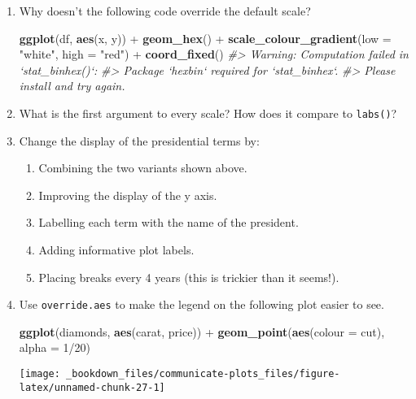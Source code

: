 \documentclass[]{book}
\newenvironment{Shaded}{\begin{snugshade}}{\end{snugshade}}
\newcommand{\KeywordTok}[1]{\textcolor[rgb]{0.13,0.29,0.53}{\textbf{{#1}}}}
\newcommand{\DataTypeTok}[1]{\textcolor[rgb]{0.13,0.29,0.53}{{#1}}}
\newcommand{\DecValTok}[1]{\textcolor[rgb]{0.00,0.00,0.81}{{#1}}}
\newcommand{\StringTok}[1]{\textcolor[rgb]{0.31,0.60,0.02}{{#1}}}
\newcommand{\CommentTok}[1]{\textcolor[rgb]{0.56,0.35,0.01}{\textit{{#1}}}}
\newcommand{\NormalTok}[1]{{#1}}
\providecommand{\tightlist}{%
  \setlength{\itemsep}{0pt}\setlength{\parskip}{0pt}}
\begin{document}
\begin{enumerate}
\def\labelenumi{\arabic{enumi}.}
\item
  Why doesn't the following code override the default scale?

\begin{Shaded}
\begin{Highlighting}[]
\KeywordTok{ggplot}\NormalTok{(df, }\KeywordTok{aes}\NormalTok{(x, y)) +}
\StringTok{  }\KeywordTok{geom_hex}\NormalTok{() +}
\StringTok{  }\KeywordTok{scale_colour_gradient}\NormalTok{(}\DataTypeTok{low =} \StringTok{"white"}\NormalTok{, }\DataTypeTok{high =} \StringTok{"red"}\NormalTok{) +}
\StringTok{  }\KeywordTok{coord_fixed}\NormalTok{()}
\CommentTok{#> Warning: Computation failed in `stat_binhex()`:}
\CommentTok{#> Package `hexbin` required for `stat_binhex`.}
\CommentTok{#> Please install and try again.}
\end{Highlighting}
\end{Shaded}
\item
  What is the first argument to every scale? How does it compare to
  \texttt{labs()}?
\item
  Change the display of the presidential terms by:

  \begin{enumerate}
  \def\labelenumii{\arabic{enumii}.}
  \tightlist
  \item
    Combining the two variants shown above.
  \item
    Improving the display of the y axis.
  \item
    Labelling each term with the name of the president.
  \item
    Adding informative plot labels.
  \item
    Placing breaks every 4 years (this is trickier than it seems!).
  \end{enumerate}
\item
  Use \texttt{override.aes} to make the legend on the following plot
  easier to see.

\begin{Shaded}
\begin{Highlighting}[]
\KeywordTok{ggplot}\NormalTok{(diamonds, }\KeywordTok{aes}\NormalTok{(carat, price)) +}
\StringTok{  }\KeywordTok{geom_point}\NormalTok{(}\KeywordTok{aes}\NormalTok{(}\DataTypeTok{colour =} \NormalTok{cut), }\DataTypeTok{alpha =} \DecValTok{1}\NormalTok{/}\DecValTok{20}\NormalTok{)}
\end{Highlighting}
\end{Shaded}

  \begin{center}\texttt{[image: \_bookdown\_files/communicate-plots\_files/figure-latex/unnamed-chunk-27-1]} \end{center}
\end{enumerate}
\end{document}
